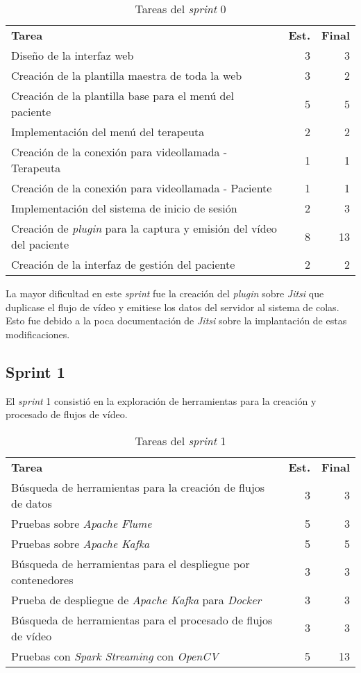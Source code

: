 \begin{table}[H]
	\begin{tabularx}{\linewidth}{X r r}
		\toprule \textbf{Tarea} & \textbf{Est.} & \textbf{Final}\\
		\otoprule
		Diseño de la interfaz web & 3 & 3 \\
		Creación de la plantilla maestra de toda la web & 3 & 2 \\
		Creación de la plantilla base para el menú del paciente & 5 & 5 \\
		Implementación del menú del terapeuta & 2 & 2 \\
		Creación de la conexión para videollamada - Terapeuta & 1 & 1 \\
		Creación de la conexión para videollamada - Paciente & 1 & 1 \\
		Implementación del sistema de inicio de sesión & 2 & 3 \\
		Creación de \textit{plugin} para la captura y emisión del vídeo del paciente & 8 & 13 \\
		Creación de la interfaz de gestión del paciente  & 2 & 2	\\	
		\bottomrule
	\end{tabularx}
	\caption{Tareas del \textit{sprint} 0}
	\label{tab:sprint0}
\end{table}

La mayor dificultad en este \textit{sprint} fue la creación del \textit{plugin} sobre \textit{Jitsi} que duplicase el flujo de vídeo y emitiese los datos del servidor al sistema de colas. Esto fue debido a la poca documentación de \textit{Jitsi} sobre la implantación de estas modificaciones. 


\subsection{Sprint 1}

El \textit{sprint} 1 consistió en la exploración de herramientas para la creación y procesado de flujos de vídeo. 

\begin{table}[H]
	\begin{tabularx}{\linewidth}{X r r}
		\toprule \textbf{Tarea} & \textbf{Est.} & \textbf{Final}\\
		\otoprule
		Búsqueda de herramientas para la creación de flujos de datos & 3 & 3 \\
		Pruebas sobre \textit{Apache Flume} & 5 & 3 \\
		Pruebas sobre \textit{Apache Kafka} & 5 & 5 \\
		Búsqueda de herramientas para el despliegue por contenedores & 3 & 3 \\
		Prueba de despliegue de \textit{Apache Kafka} para \textit{Docker} & 3 & 3 \\
		Búsqueda de herramientas para el procesado de flujos de vídeo & 3 & 3 \\
		Pruebas con \textit{Spark Streaming} con \textit{OpenCV} & 5 & 13 \\
		\bottomrule
	\end{tabularx}
	\caption{Tareas del \textit{sprint} 1}
	\label{tab:sprint1}
\end{table}


